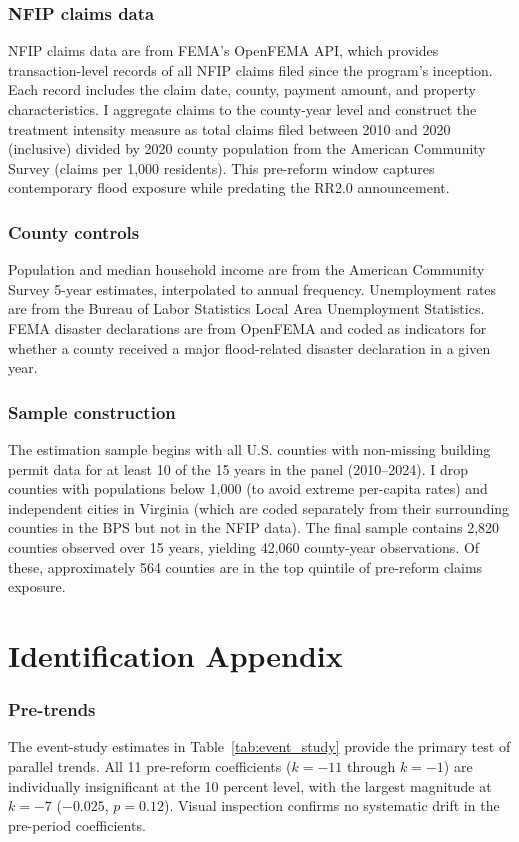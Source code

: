 \documentclass[12pt]{article}
\begin{document}
\subsubsection*{NFIP claims data} NFIP claims data are from FEMA's OpenFEMA API, which provides transaction-level records of all NFIP claims filed since the program's inception. Each record includes the claim date, county, payment amount, and property characteristics. I aggregate claims to the county-year level and construct the treatment intensity measure as total claims filed between 2010 and 2020 (inclusive) divided by 2020 county population from the American Community Survey (claims per 1,000 residents). This pre-reform window captures contemporary flood exposure while predating the RR2.0 announcement.

\subsubsection*{County controls} Population and median household income are from the American Community Survey 5-year estimates, interpolated to annual frequency. Unemployment rates are from the Bureau of Labor Statistics Local Area Unemployment Statistics. FEMA disaster declarations are from OpenFEMA and coded as indicators for whether a county received a major flood-related disaster declaration in a given year.

\subsubsection*{Sample construction} The estimation sample begins with all U.S. counties with non-missing building permit data for at least 10 of the 15 years in the panel (2010--2024). I drop counties with populations below 1,000 (to avoid extreme per-capita rates) and independent cities in Virginia (which are coded separately from their surrounding counties in the BPS but not in the NFIP data). The final sample contains 2,820 counties observed over 15 years, yielding 42,060 county-year observations. Of these, approximately 564 counties are in the top quintile of pre-reform claims exposure.


\section{Identification Appendix}
\label{sec:app_id}

\subsubsection*{Pre-trends} The event-study estimates in Table~\ref{tab:event_study} provide the primary test of parallel trends. All 11 pre-reform coefficients ($k = -11$ through $k = -1$) are individually insignificant at the 10 percent level, with the largest magnitude at $k = -7$ ($-0.025$, $p = 0.12$). Visual inspection confirms no systematic drift in the pre-period coefficients.
\end{document}
